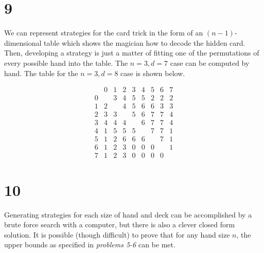 \documentclass[12pt]{article}
\begin{document}
\newpage
\section*{9}

We can represent strategies for the card trick in the form of an
$(n-1)$-dimensional table which shows the magician how to decode
the hidden card. Then, developing a strategy is just a matter of
fitting one of the permutations of every possible hand into the
table. The $n=3,d=7$ case can be computed by hand. The table for
the $n=3,d=8$ case is shown below.

$$\begin{array} {c|cccccccc}
     & 0&1&2&3&4&5&6&7 \\
     \hline
    0&  &3&4&5&5&2&2&2 \\
    1& 2& &4&5&6&6&3&3 \\
    2& 3&3& &5&6&7&7&4 \\
    3& 4&4&4& &6&7&7&4 \\
    4& 1&5&5&5& &7&7&1 \\
    5& 1&2&6&6&6& &7&1 \\
    6& 1&2&3&0&0&0& &1 \\
    7& 1&2&3&0&0&0&0&
  \end{array}$$

\section*{10}

Generating strategies for each size of hand and deck can be
accomplished by a brute force search with a computer, but there is
also a clever closed form solution. It is possible (though
difficult) to prove that for any hand size $n$, the upper bounds
as specified in {\em problems 5-6} can be met.
\end{document}

